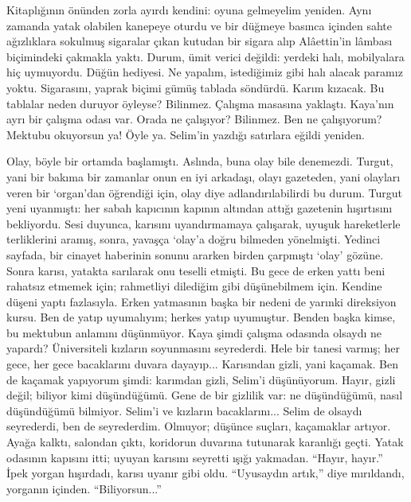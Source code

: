 \documentclass[a5paper,13pt]{scrbook}
\begin{document}
Kitaplığının önünden zorla ayırdı kendini: oyuna gelmeyelim yeniden. Aynı
zamanda yatak olabilen kanepeye oturdu ve bir düğmeye basınca içinden sahte
ağızlıklara sokulmuş sigaralar çıkan kutudan bir sigara alıp Alâettin'in lâmbası
biçimindeki çakmakla yaktı. Durum, ümit verici değildi: yerdeki halı,
mobilyalara hiç uymuyordu. Düğün hediyesi. Ne yapalım, istediğimiz gibi halı
alacak paramız yoktu. Sigarasını, yaprak biçimi gümüş tablada söndürdü. Karım
kızacak. Bu tablalar neden duruyor öyleyse? Bilinmez. Çalışma masasına yaklaştı.
Kaya'nın ayrı bir çalışma odası var. Orada ne çalışıyor? Bilinmez. Ben ne
çalışıyorum? Mektubu okuyorsun ya! Öyle ya. Selim'in yazdığı satırlara eğildi
yeniden.

Olay, böyle bir ortamda başlamıştı. Aslında, buna olay bile denemezdi. Turgut,
yani bir bakıma bir zamanlar onun en iyi arkadaşı, olayı gazeteden, yani
olayları veren bir `organ'dan öğrendiği için, olay diye adlandırılabilirdi bu
durum. Turgut yeni uyanmıştı: her sabah kapıcının kapının altından attığı
gazetenin hışırtısını bekliyordu. Sesi duyunca, karısını uyandırmamaya
çalışarak, uyuşuk hareketlerle terliklerini aramış, sonra, yavaşça `olay'a doğru
bilmeden yönelmişti. Yedinci sayfada, bir cinayet haberinin sonunu ararken
birden çarpmıştı `olay' gözüne. Sonra karısı, yatakta sarılarak onu teselli
etmişti. Bu gece de erken yattı beni rahatsız etmemek için; rahmetliyi dilediğim
gibi düşünebilmem için. Kendine düşeni yaptı fazlasıyla. Erken yatmasının başka
bir nedeni de yarınki direksiyon kursu. Ben de yatıp uyumalıyım; herkes yatıp
uyumuştur. Benden başka kimse, bu mektubun anlamını düşünmüyor. Kaya şimdi
çalışma odasında olsaydı ne yapardı? Üniversiteli kızların soyunmasını
seyrederdi. Hele bir tanesi varmış; her gece, her gece bacaklarını duvara
dayayıp... Karısından gizli, yani kaçamak. Ben de kaçamak yapıyorum şimdi:
karımdan gizli, Selim'i düşünüyorum. Hayır, gizli değil; biliyor kimi
düşündüğümü. Gene de bir gizlilik var: ne düşündüğümü, nasıl düşündüğümü
bilmiyor. Selim'i ve kızların bacaklarını... Selim de olsaydı seyrederdi, ben de
seyrederdim. Olmuyor; düşünce suçları, kaçamaklar artıyor. Ayağa kalktı,
salondan çıktı, koridorun duvarına tutunarak karanlığı geçti. Yatak odasının
kapısını itti; uyuyan karısını seyretti ışığı yakmadan. ``Hayır, hayır.'' İpek
yorgan hışırdadı, karısı uyanır gibi oldu. ``Uyusaydın artık,'' diye mırıldandı,
yorganın içinden. ``Biliyorsun...''
\end{document}
